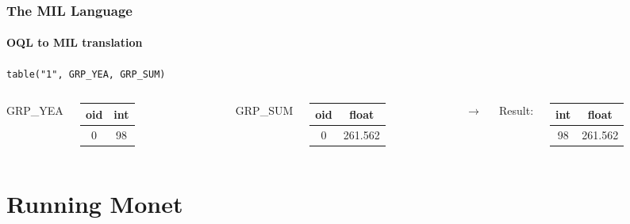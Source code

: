 \documentclass{beamer}
\begin{document}
\begin{frame}
  \frametitle{The MIL Language}
  \framesubtitle{OQL to MIL translation}

  \begin{block}{}
  {\tt table("1", GRP\_YEA, GRP\_SUM)}
  \end{block}

  \begin{columns}

  \column{2cm}

  GRP\_YEA
  \begin{tabular}{|c|c|}
    \hline
    oid & int \\
    \hline
    0 & 98 \\
    \hline
  \end{tabular}
  \column{1.5cm}

  GRP\_SUM
  \begin{tabular}{|c|c|}
    \hline
    oid & float \\
    \hline
    0 & 261.562 \\
    \hline
  \end{tabular}

  \column{0.5cm}

  $\longrightarrow$

  \column{1cm}

  Result:
  \begin{tabular}{|c|c|}
    \hline
    int & float \\
    \hline
    98 & 261.562 \\
    \hline
  \end{tabular}

  \end{columns}

\end{frame}

\section{Running Monet}
\end{document}
